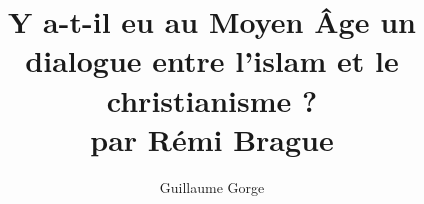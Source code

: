 \documentclass[oneside,10pt]{article}
\title{Y a-t-il eu au Moyen Âge un dialogue entre l’islam et le christianisme ? \\ par Rémi Brague}
\author{Guillaume Gorge}
\begin{document}
 

\maketitle





\setcounter{page}{1}
 



%
%

% 
%
%
%

%
%

%
%
%
 
 

%
%

%
\begin{singlespace}

\end{singlespace}
\end{document}
